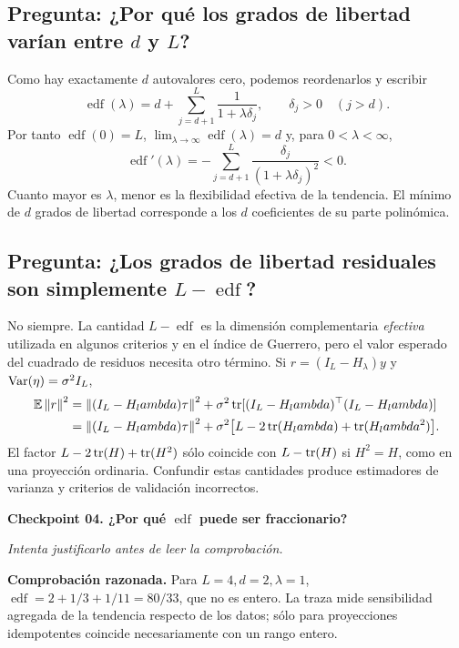 \documentclass[11pt,letterpaper,parskip=half,headings=small]{scrartcl}
\theoremstyle{definition}\newtheorem{definicion}[proposicion]{Definición}
\theoremstyle{remark}\newtheorem{observacion}[proposicion]{Observación}
\newcommand{\norm}[1]{\left\lVert#1\right\rVert}\newcommand{\inner}[2]{\left\langle#1,#2\right\rangle}
\newcommand{\pregunta}[1]{\subsection{Pregunta: #1}}
\newcommand{\checkpoint}[3]{%
  \par\medskip\noindent\textbf{\color{blue!45!black}Checkpoint #1. #2}\par
  \noindent\emph{Intenta justificarlo antes de leer la comprobación.}\par
  \noindent\textbf{Comprobación razonada. }#3\par\bigskip
}
\begin{document}
\pregunta{¿Por qué los grados de libertad varían entre $d$ y $L$?}
Como hay exactamente $d$ autovalores cero, podemos reordenarlos y escribir
\[
\operatorname{edf}(\lambda)=d+\sum_{j=d+1}^L\frac{1}{1+\lambda\delta_j},
\qquad\delta_j>0\quad(j>d).
\]
Por tanto $\operatorname{edf}(0)=L$, $\lim_{\lambda\to\infty}\operatorname{edf}(\lambda)=d$ y, para $0<\lambda<\infty$,
\begin{equation}\label{eq:edfd}
\operatorname{edf}'(\lambda)=-\sum_{j=d+1}^L
\frac{\delta_j}{(1+\lambda\delta_j)^2}<0.
\end{equation}
Cuanto mayor es $\lambda$, menor es la flexibilidad efectiva de la tendencia. El mínimo de $d$ grados de libertad corresponde a los $d$ coeficientes de su parte polinómica.

\pregunta{¿Los grados de libertad residuales son simplemente $L-\operatorname{edf}$?}
No siempre. La cantidad $L-\operatorname{edf}$ es la dimensión complementaria \emph{efectiva} utilizada en algunos criterios y en el índice de Guerrero, pero el valor esperado del cuadrado de residuos necesita otro término. Si $r=(I_L-H_\lambda)y$ y $\operatorname{Var}(\eta)=\sigma^2I_L$,
\begin{align}
\EE\norm r^2&=\norm{(I_L-H_\lambda)\tau}^2
+\sigma^2\tr[(I_L-H_\lambda)^\top(I_L-H_\lambda)]\\
&=\norm{(I_L-H_\lambda)\tau}^2
+\sigma^2\bigl[L-2\tr(H_\lambda)+\tr(H_\lambda^2)\bigr].\label{eq:res-df}
\end{align}
El factor $L-2\operatorname{tr}(H)+\operatorname{tr}(H^2)$ sólo coincide con $L-\operatorname{tr}(H)$ si $H^2=H$, como en una proyección ordinaria. Confundir estas cantidades produce estimadores de varianza y criterios de validación incorrectos.

\checkpoint{04}{¿Por qué $\operatorname{edf}$ puede ser fraccionario?}{Para $L=4,d=2,\lambda=1$, $\operatorname{edf}=2+1/3+1/11=80/33$, que no es entero. La traza mide sensibilidad agregada de la tendencia respecto de los datos; sólo para proyecciones idempotentes coincide necesariamente con un rango entero.}
\end{document}
